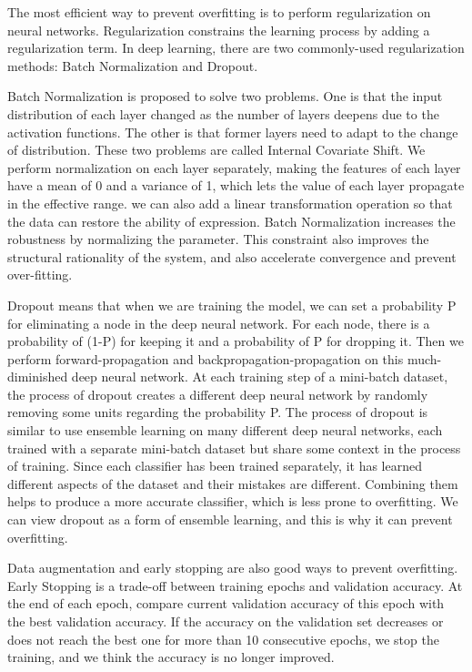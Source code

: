 \documentclass{article}
\begin{document}
The most efficient way to prevent overfitting is to perform regularization on neural networks. Regularization constrains the learning process by adding a regularization term. In deep learning, there are two commonly-used regularization methods: Batch Normalization and Dropout.

Batch Normalization is proposed to solve two problems. One is that the input distribution of each layer changed as the number of layers deepens due to the activation functions. The other is that former layers need to adapt to the change of distribution. These two problems are called Internal Covariate Shift. We perform normalization on each layer separately, making the features of each layer have a mean of 0 and a variance of 1, which lets the value of each layer propagate in the effective range. we can also add a linear transformation operation so that the data can restore the ability of expression. Batch Normalization increases the robustness by normalizing the parameter. This constraint also improves the structural rationality of the system, and also accelerate convergence and prevent over-fitting.

Dropout means that when we are training the model, we can set a probability P for eliminating a node in the deep neural network. For each node, there is a probability of (1-P) for keeping it and a probability of P for dropping it. Then we perform forward-propagation and backpropagation-propagation on this much-diminished deep neural network. At each training step of a mini-batch dataset, the process of dropout creates a different deep neural network by randomly removing some units regarding the probability P. The process of dropout is similar to use ensemble learning on many different deep neural networks, each trained with a separate mini-batch dataset but share some context in the process of training. Since each classifier has been trained separately, it has learned different aspects of the dataset and their mistakes are different. Combining them helps to produce a more accurate classifier, which is less prone to overfitting. We can view dropout as a form of ensemble learning, and this is why it can prevent overfitting.

Data augmentation and early stopping are also good ways to prevent overfitting. Early Stopping is a trade-off between training epochs and validation accuracy. At the end of each epoch, compare current validation accuracy of this epoch with the best validation accuracy. If the accuracy on the validation set decreases or does not reach the best one for more than 10 consecutive epochs, we stop the training, and we think the accuracy is no longer improved.
\end{document}
